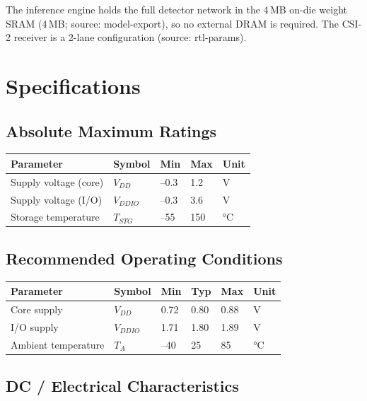 \documentclass{anvil-datasheet}
\begin{document}
The inference engine holds the full detector network in the 4\,MB on-die weight
SRAM (4\,MB; source: model-export), so no external DRAM is required. The CSI-2
receiver is a 2-lane configuration (source: rtl-params).

\section{Specifications}

\subsection{Absolute Maximum Ratings}

\begin{specbox}
\begin{tabularx}{\textwidth}{@{} X l l l l @{}}
\toprule
\textbf{Parameter} & \textbf{Symbol} & \textbf{Min} & \textbf{Max} & \textbf{Unit} \\
\midrule
Supply voltage (core) & $V_{DD}$ & --0.3 & 1.2 & V \\
Supply voltage (I/O) & $V_{DDIO}$ & --0.3 & 3.6 & V \\
Storage temperature & $T_{STG}$ & --55 & 150 & °C \\
\bottomrule
\end{tabularx}
\end{specbox}

\subsection{Recommended Operating Conditions}

\begin{specbox}
\begin{tabularx}{\textwidth}{@{} X l l l l l @{}}
\toprule
\textbf{Parameter} & \textbf{Symbol} & \textbf{Min} & \textbf{Typ} & \textbf{Max} & \textbf{Unit} \\
\midrule
Core supply & $V_{DD}$ & 0.72 & 0.80 & 0.88 & V \\
I/O supply & $V_{DDIO}$ & 1.71 & 1.80 & 1.89 & V \\
Ambient temperature & $T_A$ & --40 & 25 & 85 & °C \\
\bottomrule
\end{tabularx}
\end{specbox}

\subsection{DC / Electrical Characteristics}
\end{document}
